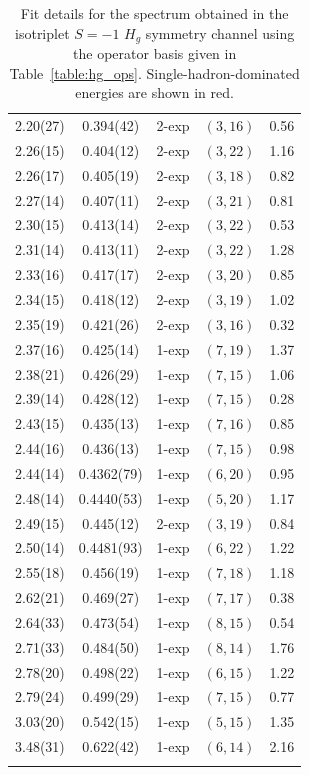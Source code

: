 \begin{longtabu}{c|c|c|c|c}
        2.20(27)&0.394(42)&2{-}exp&$(3, 16)$&0.56 \\
        2.26(15)&0.404(12)&2{-}exp&$(3, 22)$&1.16 \\
        2.26(17)&0.405(19)&2{-}exp&$(3, 18)$&0.82 \\
        2.27(14)&0.407(11)&2{-}exp&$(3, 21)$&0.81 \\
        2.30(15)&0.413(14)&2{-}exp&$(3, 22)$&0.53 \\
        2.31(14)&0.413(11)&2{-}exp&$(3, 22)$&1.28 \\
        2.33(16)&0.417(17)&2{-}exp&$(3, 20)$&0.85 \\
        \rowfont{\color{red}}
        2.34(15)&0.418(12)&2{-}exp&$(3, 19)$&1.02 \\
        \rowfont{\color{red}}
        2.35(19)&0.421(26)&2{-}exp&$(3, 16)$&0.32 \\
        \rowfont{\color{red}}
        2.37(16)&0.425(14)&1{-}exp&$(7, 19)$&1.37 \\
        2.38(21)&0.426(29)&1{-}exp&$(7, 15)$&1.06 \\
        2.39(14)&0.428(12)&1{-}exp&$(7, 15)$&0.28 \\
        2.43(15)&0.435(13)&1{-}exp&$(7, 16)$&0.85 \\
        2.44(16)&0.436(13)&1{-}exp&$(7, 15)$&0.98 \\
        \rowfont{\color{red}}
        2.44(14)&0.4362(79)&1{-}exp&$(6, 20)$&0.95 \\
        2.48(14)&0.4440(53)&1{-}exp&$(5, 20)$&1.17 \\
        \rowfont{\color{red}}
        2.49(15)&0.445(12)&2{-}exp&$(3, 19)$&0.84 \\
        \rowfont{\color{red}}
        2.50(14)&0.4481(93)&1{-}exp&$(6, 22)$&1.22 \\
        2.55(18)&0.456(19)&1{-}exp&$(7, 18)$&1.18 \\
        \rowfont{\color{red}}
        2.62(21)&0.469(27)&1{-}exp&$(7, 17)$&0.38 \\
        2.64(33)&0.473(54)&1{-}exp&$(8, 15)$&0.54 \\
        2.71(33)&0.484(50)&1{-}exp&$(8, 14)$&1.76 \\
        2.78(20)&0.498(22)&1{-}exp&$(6, 15)$&1.22 \\
        2.79(24)&0.499(29)&1{-}exp&$(7, 15)$&0.77 \\
        \rowfont{\color{red}}
        3.03(20)&0.542(15)&1{-}exp&$(5, 15)$&1.35 \\
        3.48(31)&0.622(42)&1{-}exp&$(6, 14)$&2.16 \\
    \caption{Fit details for the spectrum obtained in the isotriplet $S=-1$ $H_g$ symmetry channel using the operator basis given in Table~\ref{table:hg_ops}. Single-hadron-dominated energies are shown in red.}\label{table:hg_fits}
\end{longtabu}
\renewcommand{\arraystretch}{1.5}

